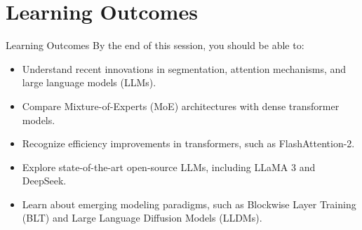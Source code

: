 \section{Learning Outcomes}
\begin{frame}{Learning Outcomes}
    By the end of this session, you should be able to:
    \begin{itemize}
        \setlength{\itemsep}{1em}
        \item Understand recent innovations in segmentation, attention mechanisms, and large language models (LLMs).
        \item Compare Mixture-of-Experts (MoE) architectures with dense transformer models.
        \item Recognize efficiency improvements in transformers, such as FlashAttention-2.
        \item Explore state-of-the-art open-source LLMs, including LLaMA 3 and DeepSeek.
        \item Learn about emerging modeling paradigms, such as Blockwise Layer Training (BLT) and Large Language Diffusion Models (LLDMs).
    \end{itemize}
\end{frame}
